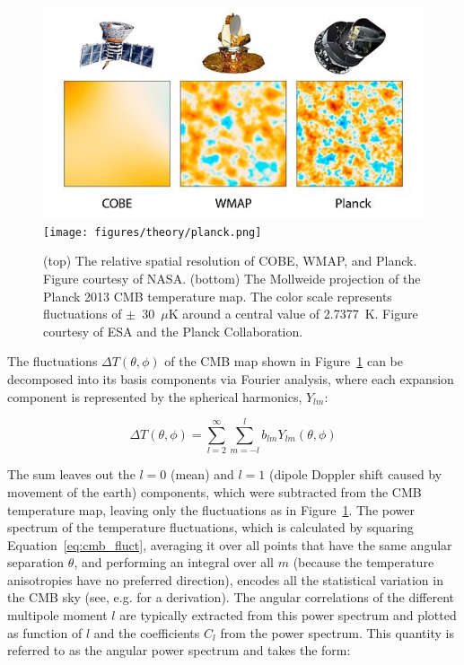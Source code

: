 \begin{figure}[htbp]
\begin{center}
\includegraphics[width=.6\textwidth]{figures/theory/satellites.jpg}
\texttt{[image: figures/theory/planck.png]}
\caption{(top) The relative spatial resolution of COBE, WMAP, and Planck. Figure courtesy of NASA. (bottom) The Mollweide projection of the Planck 2013 CMB temperature map. The color scale represents fluctuations of $\pm$~30~$\mu$K around a central value of 2.7377~K. Figure courtesy of ESA and the Planck Collaboration. }
\label{fig:cmb}
\end{center}
\end{figure}

The fluctuations $\Delta T(\theta, \phi)$ of the \ac{CMB} map shown in Figure~\ref{fig:cmb} can be decomposed into its basis components via Fourier analysis, where each expansion component is represented by the spherical harmonics, $Y_{lm}$:

\begin{equation}
\label{eq:cmb_fluct}
\Delta T(\theta, \phi) = \sum_{l=2}^{\infty} \sum_{m=-l}^{l} b_{lm} Y_{lm}(\theta, \phi)
\end{equation}

The sum leaves out the $l=0$ (mean) and $l=1$ (dipole Doppler shift caused by movement of the earth) components, which were subtracted from the \ac{CMB} temperature map, leaving only the fluctuations as in Figure~\ref{fig:cmb}. The power spectrum of the temperature fluctuations, which is calculated by squaring Equation~\ref{eq:cmb_fluct}, averaging it over all points that have the same angular separation $\theta$, and performing an integral over all $m$ (because the temperature anisotropies have no preferred direction), encodes all the statistical variation in the \ac{CMB} sky (see, e.g. \cite{Hu2008} for a derivation). The angular correlations of the different multipole moment $l$ are typically extracted from this power spectrum and plotted as function of $l$ and the coefficients $C_{l}$ from the power spectrum. This quantity is referred to as the angular power spectrum and takes the form:

